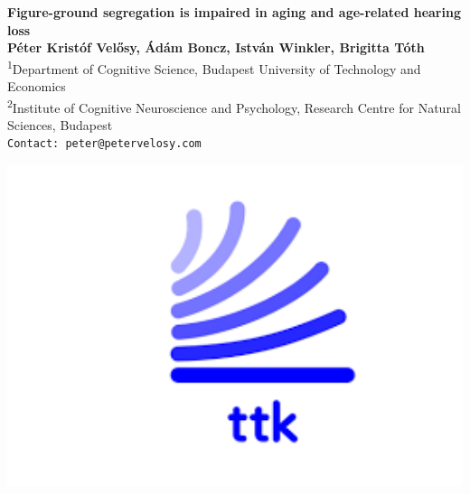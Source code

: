 \documentclass[a0,portrait]{a0poster}
\begin{document}


\begin{minipage}[b]{0.75\linewidth}
\veryHuge \color{NavyBlue} \textbf{Figure-ground segregation is impaired in aging and age-related hearing loss} \color{Black}\\ %
\huge \textbf{Péter Kristóf Velősy\footnotemark[1], Ádám Boncz\footnotemark[2], István Winkler\footnotemark[2], Brigitta Tóth\footnotemark[2]}\\[0.5cm] %
\Large \textsuperscript{1}Department of Cognitive Science, Budapest University of Technology and Economics\\[0.4cm] %
\Large \textsuperscript{2}Institute of Cognitive Neuroscience and Psychology,
Research Centre for Natural Sciences, Budapest\\[0.4cm] %
\Large \texttt{Contact: peter@petervelosy.com}\\
\end{minipage}
%
\begin{minipage}[b]{0.25\linewidth}
\includegraphics[width=20cm]{ttk_logo.png}\\
\end{minipage}
\end{document}
